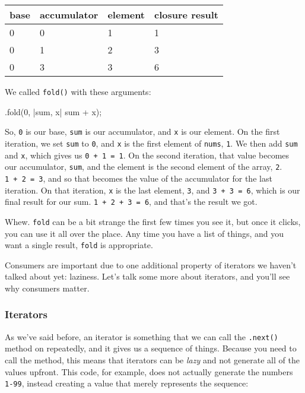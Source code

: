\documentclass[a4paper,]{book}
\renewcommand*{\hypertarget}[3][\ar]{%
  \def\ar{#2}%
  \label{#1}%
  #3}
\newenvironment{Shaded}{\begin{snugshade}}{\end{snugshade}}
\newcommand{\DecValTok}[1]{\textcolor[rgb]{0.00,0.00,0.81}{{#1}}}
\newcommand{\NormalTok}[1]{{#1}}
\begin{document}
\begin{longtable}[]{@{}llll@{}}
\toprule
base & accumulator & element & closure result\tabularnewline
\midrule
\endhead
0 & 0 & 1 & 1\tabularnewline
0 & 1 & 2 & 3\tabularnewline
0 & 3 & 3 & 6\tabularnewline
\bottomrule
\end{longtable}

We called \texttt{fold()} with these arguments:

\begin{Shaded}
\begin{Highlighting}[]
\NormalTok{.fold(}\DecValTok{0}\NormalTok{, |sum, x| sum + x);}
\end{Highlighting}
\end{Shaded}

So, \texttt{0} is our base, \texttt{sum} is our accumulator, and
\texttt{x} is our element. On the first iteration, we set \texttt{sum}
to \texttt{0}, and \texttt{x} is the first element of \texttt{nums},
\texttt{1}. We then add \texttt{sum} and \texttt{x}, which gives us
\texttt{0\ +\ 1\ =\ 1}. On the second iteration, that value becomes our
accumulator, \texttt{sum}, and the element is the second element of the
array, \texttt{2}. \texttt{1\ +\ 2\ =\ 3}, and so that becomes the value
of the accumulator for the last iteration. On that iteration, \texttt{x}
is the last element, \texttt{3}, and \texttt{3\ +\ 3\ =\ 6}, which is
our final result for our sum. \texttt{1\ +\ 2\ +\ 3\ =\ 6}, and that's
the result we got.

Whew. \texttt{fold} can be a bit strange the first few times you see it,
but once it clicks, you can use it all over the place. Any time you have
a list of things, and you want a single result, \texttt{fold} is
appropriate.

Consumers are important due to one additional property of iterators we
haven't talked about yet: laziness. Let's talk some more about
iterators, and you'll see why consumers matter.

\hypertarget{iterators}{\subsubsection{Iterators}\label{iterators}}

As we've said before, an iterator is something that we can call the
\texttt{.next()} method on repeatedly, and it gives us a sequence of
things. Because you need to call the method, this means that iterators
can be \emph{lazy} and not generate all of the values upfront. This
code, for example, does not actually generate the numbers \texttt{1-99},
instead creating a value that merely represents the sequence:
\end{document}
